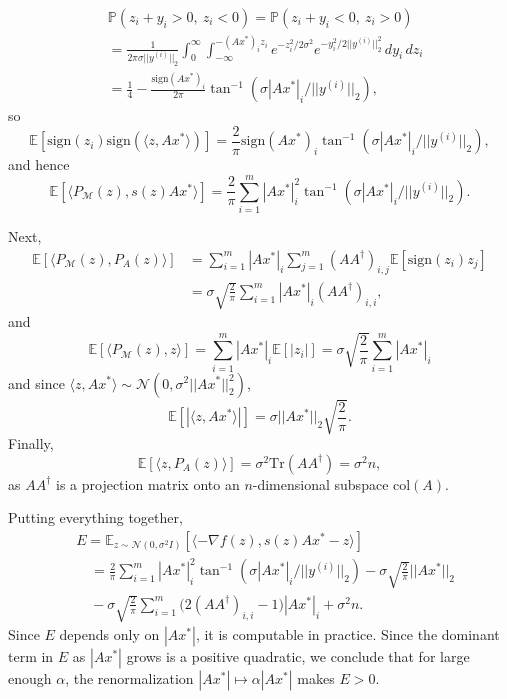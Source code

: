 \documentclass[12pt]{article}
\theoremstyle{definition}
\theoremstyle{remark}
\theoremstyle{definition}
\theoremstyle{problem}
\theoremstyle{definition}
\newcommand{\Tr}{\text{Tr}}
\newcommand{\col}{\text{col}}
\newcommand{\sign}{\text{sign}}
\newcommand{\atan}{\tan^{-1}}
\newcommand{\MM}{\mathcal{M}}
\newcommand{\PP}{\mathbb{P}}
\newcommand{\EE}{\mathbb{E}}
\begin{document}
\[\begin{aligned} &\PP(z_i + y_i > 0,\ z_i < 0) = \PP(z_i + y_i < 0,\ z_i > 0)\\
&= \frac{1}{2\pi\sigma||y^{(i)}||_2}\int_0^{\infty}\int_{-\infty}^{-(Ax^*)_iz_i}e^{-z_i^2/2\sigma^2}e^{-y_i^2/2||y^{(i)}||_2^2}\, dy_i\, dz_i\\
&= \frac{1}{4} - \frac{\sign(Ax^*)_i}{2\pi}\atan(\sigma|Ax^*|_i/||y^{(i)}||_2),\end{aligned}\]
so
\[ \EE[\sign(z_i)\sign(\langle z,Ax^*\rangle)] = \frac{2}{\pi}\sign(Ax^*)_i\atan(\sigma|Ax^*|_i/||y^{(i)}||_2),\]
and hence
\[\EE\left[\langle P_{\MM}(z), s(z)Ax^*\rangle\right] = \frac{2}{\pi}\sum_{i=1}^m|Ax^*|_i^2\atan(\sigma|Ax^*|_i/||y^{(i)}||_2).\]

Next,
\[\begin{aligned} \EE[\langle P_{\MM}(z), P_A(z)\rangle] &= \sum_{i=1}^m|Ax^*|_i\sum_{j=1}^m(AA^{\dagger})_{i,j}\EE[\sign(z_i)z_j] \\&= \sigma\sqrt{\frac{2}{\pi}}\sum_{i=1}^m|Ax^*|_i(AA^{\dagger})_{i,i},\end{aligned}\]
and
\[\EE\left[\langle P_{\MM}(z),z\rangle\right] = \sum_{i=1}^m|Ax^*|_i\EE[|z_i|] = \sigma\sqrt{\frac{2}{\pi}}\sum_{i=1}^m|Ax^*|_i\]
and since $\langle z,Ax^*\rangle\sim\mathcal{N}(0, \sigma^2||Ax^*||_2^2)$,
\[\EE[|\langle z,Ax^*\rangle|] = \sigma||Ax^*||_2\sqrt{\frac{2}{\pi}}.\]
Finally,
\[\EE[\langle z, P_A(z)\rangle] = \sigma^2\Tr(AA^{\dagger}) = \sigma^2n,\]
as $AA^{\dagger}$ is a projection matrix onto an $n$-dimensional subspace $\col(A)$.

Putting everything together,
\[\begin{aligned}&E=\EE_{z\sim \mathcal{N}(0,\sigma^2I)}\left[\langle -\nabla f(z), s(z)Ax^*-z\rangle\right]\\
&\quad= \frac{2}{\pi}\sum_{i=1}^m|Ax^*|_i^2\atan(\sigma|Ax^*|_i/||y^{(i)}||_2) - \sigma\sqrt{\frac{2}{\pi}}||Ax^*||_2\\
&\quad- \sigma\sqrt{\frac{2}{\pi}}\sum_{i=1}^m\Big(2(AA^{\dagger})_{i,i}-1\Big)|Ax^*|_i + \sigma^2n.\end{aligned}\]
Since $E$ depends only on $|Ax^*|$, it is computable in practice. Since the dominant term in $E$ as $|Ax^*|$ grows is a positive quadratic, we conclude that for large enough $\alpha$, the renormalization $|Ax^*|\mapsto \alpha|Ax^*|$ makes $E>0$.
\end{document}
